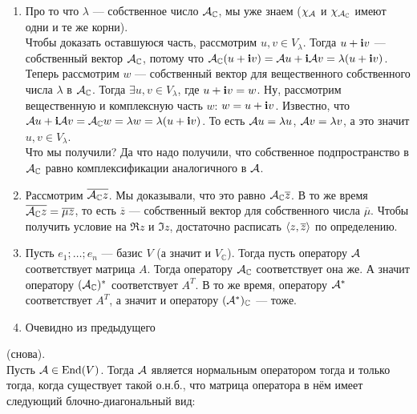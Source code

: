 \documentclass{article}
\let\complexIm\Im
\DeclareMathOperator{\operIm}{Im}
\let\Im\operIm
\begin{document}
\begin{itemize}
\begin{Proof}
            \begin{enumerate}
                \item Про то что $\lambda$ --- собственное число ${\mathcal{A}}_{\mathbb C}$, мы уже знаем ($\chi_{{\mathcal{A}}}$ и $\chi_{{\mathcal{A}}_{\mathbb C}}$ имеют одни и те же корни).\\
                Чтобы доказать оставшуюся часть, рассмотрим $u,v\in V_\lambda$. Тогда $u+{\mathbf i} v$ --- собственный вектор ${\mathcal{A}}_{\mathbb C}$, потому что ${\mathcal{A}}_{\mathbb C}(u+{\mathbf i} v)={\mathcal{A}} u+{\mathbf i}{\mathcal{A}} v=\lambda(u+{\mathbf i} v)$.\\
                Теперь рассмотрим $w$ --- собственный вектор для вещественного собственного числа $\lambda$ в ${\mathcal{A}}_{\mathbb C}$. Тогда $\exists u,v\in V_\lambda$, где $u+{\mathbf i} v=w$. Ну, рассмотрим вещественную и комплексную часть $w$: $w=u+{\mathbf i} v$. Известно, что ${\mathcal{A}} u+{\mathbf i}{\mathcal{A}} v={\mathcal{A}}_{\mathbb C}w=\lambda w=\lambda(u+{\mathbf i} v)$. То есть ${\mathcal{A}} u=\lambda u$, ${\mathcal{A}} v=\lambda v$, а это значит $u,v\in V_\lambda$.\\
                Что мы получили? Да что надо получили, что собственное подпространство в ${\mathcal{A}}_{\mathbb C}$ равно комплексификации аналогичного в ${\mathcal{A}}$.
                \item Рассмотрим $\overline{{\mathcal{A}}_{\mathbb C} z}$. Мы доказывали, что это равно ${\mathcal{A}}_{\mathbb C}\overline z$. В то же время $\overline{{\mathcal{A}}_{\mathbb C} z}=\overline\mu\overline z$, то есть $\overline z$ --- собственный вектор для собственного числа $\overline\mu$. Чтобы получить условие на $\Re z$ и $\complexIm z$, достаточно расписать ${\left\langle{z},{\overline z}\right\rangle}$ по определению.
                \item Пусть $e_1;\ldots;e_n$ --- базис $V$ (а значит и $V_{\mathbb C}$). Тогда пусть оператору ${\mathcal{A}}$ соответствует матрица $A$. Тогда оператору ${\mathcal{A}}_{\mathbb C}$ соответствует она же. А значит оператору $({\mathcal{A}}_{\mathbb C})^*$ соответствует $A^T$. В то же время, оператору ${\mathcal{A}}^*$ соответствует $A^T$, а значит и оператору $({\mathcal{A}}^*)_{\mathbb C}$ --- тоже.
                \item Очевидно из предыдущего
            \end{enumerate}
        \end{Proof}
        \thm {} (снова).\\
        Пусть ${\mathcal{A}}\in\operatorname{End}(V)$. Тогда ${\mathcal{A}}$ является нормальным оператором тогда и только тогда, когда существует такой о.н.б., что матрица оператора в нём имеет следующий блочно-диагональный вид:

\end{itemize}
\end{document}
